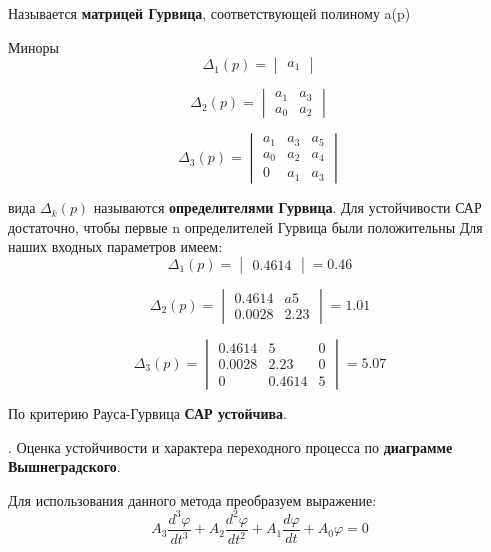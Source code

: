 \documentclass[12pt, a4paper]{report}
\def\AAAA{0.0028}
\def\AAA{0.4614}
\def\AA{2.23}
\def\A{5}
\def\D{0.46}
\def\DD{1.01}
\def\DDD{5.07}
\begin{document}
Называется \textbf{матрицей Гурвица}, соответствующей полиному a(p)

Миноры
$$
    \Delta_{1}(p) = \begin{vmatrix}
                    a_{1}
                    \end{vmatrix}
$$

$$
   \Delta_{2}(p) = \begin{vmatrix}
                    a_{1} &a_{3} \\
                    a_{0} &a_{2}
                    \end{vmatrix}
$$

$$
   \Delta_{3}(p) = \begin{vmatrix}
                    a_{1} &a_{3} &a_{5}\\
                    a_{0} &a_{2} &a_{4}\\
                    0     &a_{1} &a_{3}
                    \end{vmatrix}
$$

вида $ {\textstyle \Delta _{k}(p)} $ называются \textbf{определителями Гурвица}. Для устойчивости САР достаточно, чтобы первые n определителей Гурвица были положительны
Для наших входных параметров имеем:
$$
    \Delta_{1}(p) = \begin{vmatrix}
                    \AAA
                    \end{vmatrix} = \D
$$

$$
   \Delta_{2}(p) = \begin{vmatrix}
                    \AAA &a\A \\
                    \AAAA &\AA
                    \end{vmatrix} = \DD
$$

$$
   \Delta_{3}(p) = \begin{vmatrix}
                    \AAA  &\A   &0\\
                    \AAAA &\AA  &0\\
                    0     &\AAA &\A
                    \end{vmatrix} = \DDD
$$

По критерию Рауса-Гурвица \textbf{САР устойчива}.


. Оценка устойчивости и характера переходного процесса по \textbf{диаграмме Вышнеградского}.

Для использования данного метода преобразуем выражение:
$$ A_{3}\frac{d^{3}\varphi}{dt^{3}} + A_{2}\frac{d^{2}\varphi}{dt^{2}} + A_{1}\frac{d\varphi}{dt} + A_{0}\varphi = 0 $$
\end{document}

